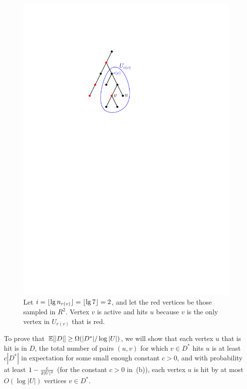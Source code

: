 
\begin{figure}\centering
\includegraphics[scale=1]{hits.pdf}
\caption{Let $i=\lfloor\lg n_{r(v)}\rfloor=\lfloor\lg 7\rfloor=2$, and let the red vertices be those sampled in $R^2$. Vertex $v$ is active and hits $u$ because $v$ is the only vertex in $U_{r(v)}$ that is red.}\label{fig:hits}
\end{figure}

To prove that $\mathbb E[|D|] \ge \Omega(|D^*|/\log|U|)$, we will show that
 \BE
 \im[(a)] each vertex $u$ that is hit is in $D$, 
 \im[(b)] the total number of pairs $(u,v)$ for which $v\in D^*$ hits $u$ is at least $c |D^*|$ in expectation for some small enough constant $c>0$, and
 \im[(c)] with probability at least $1-\frac c{2|U|^2}$ (for the constant $c>0$ in~(b)), each vertex $u$ is hit by at most $O(\log|U|)$ vertices $v\in D^*$. %
 \EE

